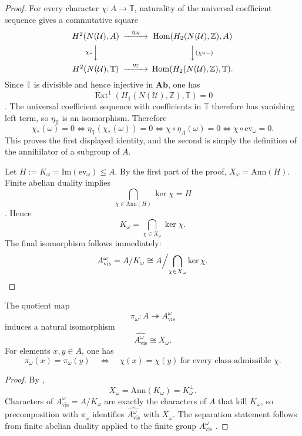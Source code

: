\begin{proof}
For every character $\chi:A\to\mathbb T$, naturality of the universal coefficient sequence gives a commutative square
\[
\begin{CD}
H^2(N(\mathcal U),A) @>\eta_A>> \mathrm{Hom}(H_2(N(\mathcal U),\mathbb Z),A) \\
@V\chi_*VV @VV(\chi\circ -)V \\
H^2(N(\mathcal U),\mathbb T) @>\eta_{\mathbb T}>> \mathrm{Hom}(H_2(N(\mathcal U),\mathbb Z),\mathbb T).
\end{CD}
\]
Since $\mathbb T$ is divisible and hence injective in $\mathbf{Ab}$, one has
\[
\operatorname{Ext}^1(H_1(N(\mathcal U),\mathbb Z),\mathbb T)=0
\]
\cite[Sec.~2.3]{Weibel1994}. The universal coefficient sequence with coefficients in $\mathbb T$ therefore has vanishing left term, so $\eta_{\mathbb T}$ is an isomorphism. Therefore
\[
\chi_*(\omega)=0
\Longleftrightarrow
\eta_{\mathbb T}(\chi_*(\omega))=0
\Longleftrightarrow
\chi\circ \eta_A(\omega)=0
\Longleftrightarrow
\chi\circ \mathrm{ev}_{\omega}=0.
\]
This proves the first displayed identity, and the second is simply the definition of the annihilator of a subgroup of $A$.

Let $H:=K_{\omega}=\mathrm{Im}(\mathrm{ev}_{\omega})\le A$. By the first part of the proof, $X_{\omega}=\mathrm{Ann}(H)$. Finite abelian duality implies
\[
\bigcap_{\chi\in \mathrm{Ann}(H)}\ker\chi=H
\]
\cite[Chaps.~5, 12]{DummitFoote2004}. Hence
\[
K_{\omega}
=
\bigcap_{\chi\in X_{\omega}}\ker\chi.
\]
The final isomorphism follows immediately:
\[
A_{\mathrm{vis}}^{\omega}
=
A/K_{\omega}
\cong
A\Big/\!\bigcap_{\chi\in X_{\omega}}\ker\chi.
\qedhere
\]
\end{proof}

\begin{corollary}\label{cor:intrinsic-character-detection}
The quotient map
\[
\pi_{\omega}:A\twoheadrightarrow A_{\mathrm{vis}}^{\omega}
\]
induces a natural isomorphism
\[
\widehat{A_{\mathrm{vis}}^{\omega}}\cong X_{\omega}.
\]
For elements $x,y\in A$, one has
\[
\pi_{\omega}(x)=\pi_{\omega}(y)
\quad\Longleftrightarrow\quad
\chi(x)=\chi(y)\ \text{for every class-admissible }\chi.
\]
\end{corollary}

\begin{proof}
By ,
\[
X_{\omega}=\mathrm{Ann}(K_{\omega})=K_{\omega}^{\perp}.
\]
Characters of $A_{\mathrm{vis}}^{\omega}=A/K_{\omega}$ are exactly the characters of $A$ that kill $K_{\omega}$, so precomposition with $\pi_{\omega}$ identifies $\widehat{A_{\mathrm{vis}}^{\omega}}$ with $X_{\omega}$. The separation statement follows from finite abelian duality applied to the finite group $A_{\mathrm{vis}}^{\omega}$ \cite[Chap.~5]{DummitFoote2004}.
\end{proof}

